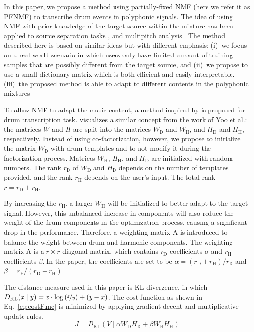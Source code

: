 \documentclass{article}
\begin{document}
In this paper, we propose a method using partially-fixed NMF (here we refer it as PFNMF) to transcribe drum events in polyphonic signals. The idea of using NMF with prior knowledge of the target source within the mixture has been applied to source separation tasks \cite{smaragdis_ssnmf_2007}, and multipitch analysis \cite{raczynski_Hnmf_2007}. The method described here is based on similar ideas but with different emphasis: 
(i)~we focus on a real world scenario in which users only have limited amount of training samples that are possibly different from the target source, and
(ii)~we propose to use a small dictionary matrix which is both efficient and easily interpretable.
(iii)~the proposed method is able to adapt to different contents in the polyphonic mixtures 

To allow NMF to adapt the music content, a method inspired by \cite{yoo_nonnegative_2010} is proposed for drum transcription task.  visualizes a similar concept from the work of Yoo et al.: the matrices $W$ and $H$ are split into the  matrices $W_\mathrm{D}$ and $W_\mathrm{H}$, and  $H_\mathrm{D}$ and $H_\mathrm{H}$, respectively. Instead of using co-factorization, however, we propose to initialize the matrix $W_\mathrm{D}$ with drum templates and to not modify it during the factorization process. Matrices $W_\mathrm{H}$, $H_\mathrm{H}$, and $H_\mathrm{D}$ are initialized with random numbers. The rank $r_\mathrm{D}$ of $W_\mathrm{D}$ and $H_\mathrm{D}$ depends on the number of templates provided, and the rank $r_\mathrm{H}$ depends on the user's input. The total rank $r = r_\mathrm{D} + r_\mathrm{H}$.

By increasing the $r_\mathrm{H}$, a larger $W_\mathrm{H}$ will be initialized to better adapt to the target signal. However, this unbalanced increase in components will also reduce the weight of the drum components in the optimization process, causing a significant drop in the performance. Therefore, a weighting matrix $\mathrm{A}$ is introduced to balance the weight between drum and harmonic components. The weighting matrix $\mathrm{A}$ is a $r \times r$ diagonal matrix, which contains $r_\mathrm{D}$ coefficients $\alpha$ and $r_\mathrm{H}$ coefficients $\beta$. In the paper, the coefficients are set to be $\alpha = (r_\mathrm{D} + r_\mathrm{H})/ r_\mathrm{D}$ and $\beta = r_\mathrm{H}/ (r_\mathrm{D} + r_\mathrm{H})$    

The distance measure used in this paper is KL-divergence, in which \(D_\mathrm{KL}(x \mid y) = x\cdot\log\left(\nicefrac{x}{y}\right) + (y - x)\). %
The cost function as shown in Eq.~\eqref{eq:costFunc} is minimized by applying gradient decent and multiplicative update rules. 
\begin{equation}
\label{eq:costFunc}
J = D_\mathrm{KL}(V \mid \alpha W_\mathrm{D}H_\mathrm{D} + \beta W_\mathrm{H}H_\mathrm{H})
\end{equation}
\end{document}
